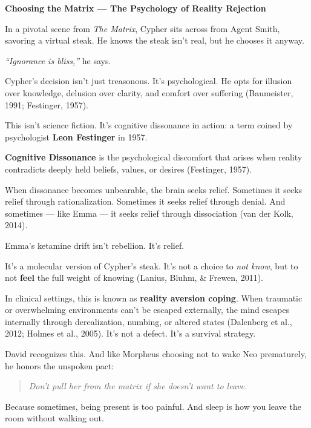 \begin{PsychologicalSidebar}{\textbf{Choosing the Matrix --- The Psychology of Reality Rejection}}

    In a pivotal scene from \textit{The Matrix}, Cypher sits across from Agent Smith, savoring 
    a virtual steak.  
    He knows the steak isn’t real, but he chooses it anyway.

    \medskip
    
    \textit{“Ignorance is bliss,”} he says.

    \medskip
    
    Cypher’s decision isn’t just treasonous. It’s psychological.  
    He opts for illusion over knowledge, delusion over clarity, and comfort over suffering 
    (Baumeister, 1991; Festinger, 1957).

    \medskip
    
    This isn’t science fiction.  
    It’s cognitive dissonance in action: a term coined by psychologist \textbf{Leon Festinger} 
    in 1957.

    \medskip
    
    \textbf{Cognitive Dissonance} is 
    the psychological discomfort that arises when reality contradicts deeply held beliefs, values, 
    or desires (Festinger, 1957).

    \medskip
    
    When dissonance becomes unbearable, the brain seeks relief.  
    Sometimes it seeks relief through rationalization.  
    Sometimes it seeks relief through denial.  
    And sometimes --- like Emma --- it seeks relief through dissociation (van der Kolk, 2014).

    \medskip
    
    Emma’s ketamine drift isn’t rebellion.  
    It’s relief.

    \medskip
    
    It's a molecular version of Cypher’s steak.  
    It's not a choice to \textit{not know}, but to not \textbf{feel} the full weight 
    of knowing (Lanius, Bluhm, \& Frewen, 2011).

    \medskip
    
    In clinical settings, this is known as \textbf{reality aversion coping}.  
    When traumatic or overwhelming environments can’t be escaped externally, the mind 
    escapes internally through derealization, numbing, or altered states 
    (Dalenberg et al., 2012; Holmes et al., 2005).  
    It’s not a defect. It’s a survival strategy.

    \medskip
    
    David recognizes this.  
    And like Morpheus choosing not to wake Neo prematurely,  
    he honors the unspoken pact:  
    
    \begin{quote}
    \textit{Don’t pull her from the matrix  
    if she doesn’t want to leave.}
    \end{quote}

    Because sometimes, being present is too painful.  
    And sleep is how you leave the room without walking out.

\end{PsychologicalSidebar}


